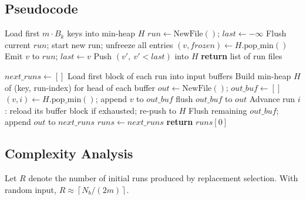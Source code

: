 \documentclass[12pt,a4paper]{article}
\newcommand{\ceil}[1]{\left\lceil #1 \right\rceil}
\begin{document}
\subsection{Pseudocode}

\begin{algorithm}[H]
\caption{External Merge Sort — Phase 1: Replacement Selection}
\begin{algorithmic}[1]
  \State Load first $m \cdot B_k$ keys into min-heap $H$
  \State $run \gets \text{NewFile}()$; $last \gets -\infty$
      \State Flush current $run$; start new run; unfreeze all entries
    \EndIf
    \State $(v, frozen) \gets H.\text{pop\_min}()$
    \State Emit $v$ to $run$; $last \gets v$
      \State Push $(v',\ v' < last)$ into $H$
    \EndIf
  \EndWhile
  \State \textbf{return} list of run files
\EndProcedure
\end{algorithmic}
\end{algorithm}

\begin{algorithm}[H]
\caption{External Merge Sort — Phase 2: Multi-Way Merge}
\begin{algorithmic}[1]
    \State $next\_runs \gets []$
      \State Load first block of each run into input buffers
      \State Build min-heap $H$ of (key, run-index) for head of each buffer
      \State $out \gets \text{NewFile}()$; $out\_buf \gets []$
        \State $(v, i) \gets H.\text{pop\_min}()$; append $v$ to $out\_buf$
         flush $out\_buf$ to $out$ \EndIf
        \State Advance run $i$: reload its buffer block if exhausted; re-push to $H$
      \EndWhile
      \State Flush remaining $out\_buf$; append $out$ to $next\_runs$
    \EndFor
    \State $runs \gets next\_runs$
  \EndWhile
  \State \textbf{return} $runs[0]$
\EndProcedure
\end{algorithmic}
\end{algorithm}

\subsection{Complexity Analysis}

Let $R$ denote the number of initial runs produced by replacement selection.
With random input, $R \approx \ceil{N_b / (2m)}$.
\end{document}
